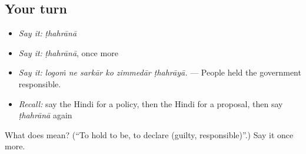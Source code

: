 \subsection*{Your turn}
\begin{itemize}
\raggedright
  \item \emph{Say it:} \emph{ṭhahrānā}
  \item \emph{Say it:} \emph{ṭhahrānā}, once more
  \item \emph{Say it:} \emph{logoṁ ne sarkār ko zimmedār ṭhahrāyā.} — People held the government responsible.
  \item \emph{Recall:} say the Hindi for a policy, then the Hindi for a proposal, then say \emph{ṭhahrānā} again
\end{itemize}

\begin{tcolorbox}[breakable,colback=teal!4,colframe=teal!35!black,title={Before you move on}]
What does  mean? (\textquotedblleft{}To hold to be, to declare (guilty, responsible)\textquotedblright{}.) Say it once more.
\end{tcolorbox}
